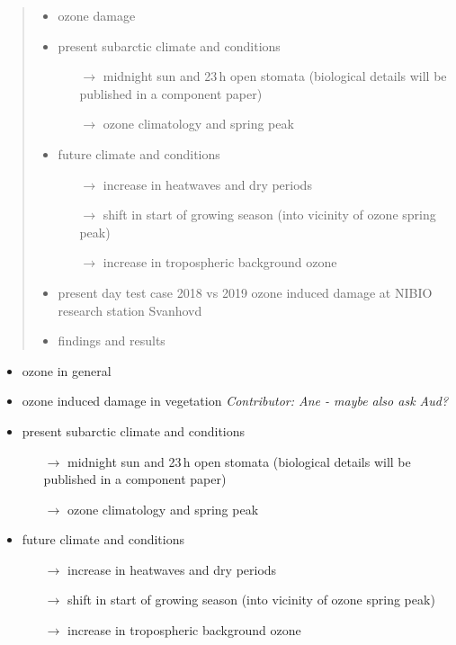 \documentclass[bg, manuscript]{copernicus}
\begin{document}
\begin{abstract}
  \begin{itemize}
  \item ozone damage
  \item present subarctic climate and conditions
    \begin{itemize}
    \item[$\rightarrow$] midnight sun and 23\,\unit{h} open stomata (biological details will be published in a component paper)
    \item[$\rightarrow$] ozone climatology and spring peak
    \end{itemize}
  \item future climate and conditions
    \begin{itemize}
    \item[$\rightarrow$] increase in heatwaves and dry periods
    \item[$\rightarrow$] shift in start of growing season (into vicinity of ozone spring peak)
    \item[$\rightarrow$] increase in tropospheric background ozone
    \end{itemize}
  \item present day test case 2018 vs 2019 ozone induced damage at NIBIO research station Svanhovd
  \item findings and results 
  \end{itemize}
\end{abstract}




\introduction  %
\label{sec:intro}
\begin{itemize}
\item ozone in general
\item ozone induced damage in vegetation \emph{Contributor: Ane - maybe also ask Aud?}
\item present subarctic climate and conditions
  \begin{itemize}
  \item[$\rightarrow$] midnight sun and 23\,\unit{h} open stomata (biological details will be published in a component paper)
  \item[$\rightarrow$] ozone climatology and spring peak
  \end{itemize}
\item future climate and conditions
  \begin{itemize}
  \item[$\rightarrow$] increase in heatwaves and dry periods
  \item[$\rightarrow$] shift in start of growing season (into vicinity of ozone spring peak)
  \item[$\rightarrow$] increase in tropospheric background ozone
  \end{itemize}
\end{itemize}
\end{document}
